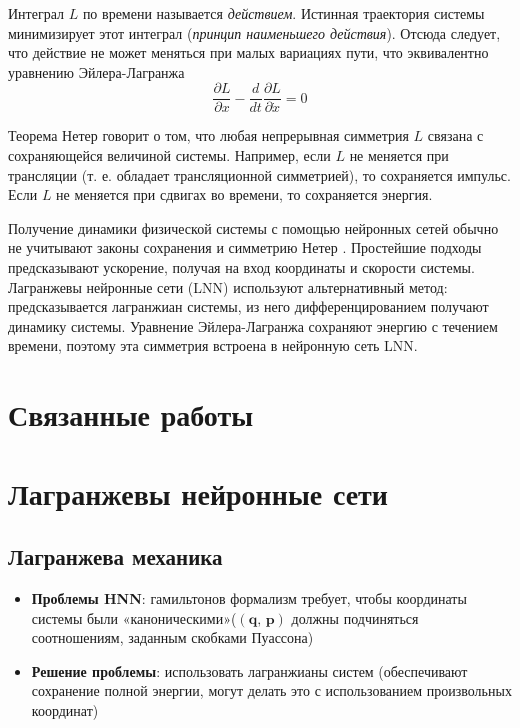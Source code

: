 \documentclass[12pt]{article}
\begin{document}
	Интеграл $L$ по времени называется \textit{действием}. Истинная траектория системы минимизирует этот интеграл (\textit{принцип наименьшего действия}). Отсюда следует, что действие не может меняться при малых вариациях пути, что эквивалентно уравнению Эйлера-Лагранжа
	$$
	\frac{\partial L}{\partial x}-\frac{d}{d t} \frac{\partial L}{\partial \dot{x}}=0
	$$
	
	Теорема Нетер говорит о том, что любая непрерывная симметрия $L$ связана с сохраняющейся величиной системы. Например, если $L$ не меняется при трансляции (т. е. обладает трансляционной симметрией), то сохраняется импульс. Если $L$ не меняется при сдвигах во времени, то сохраняется энергия.
	
	Получение динамики физической системы с помощью нейронных сетей обычно не учитывают законы сохранения и симметрию Нетер \cite{NEURIPS2019_26cd8eca, NEURIPS2019_26cd8eca, NEURIPS2019_26cd8eca}. Простейшие подходы предсказывают ускорение, получая на вход координаты и скорости системы. Лагранжевы нейронные сети (LNN) используют альтернативный метод: предсказывается лагранжиан системы, из него дифференцированием получают динамику системы. Уравнение Эйлера-Лагранжа сохраняют энергию с течением времени, поэтому эта симметрия встроена в нейронную сеть LNN.
	
	\section{Связанные работы}
	
	
	\section{Лагранжевы нейронные сети}
	\subsection{Лагранжева механика}
	\begin{itemize}
		\item \textbf{Проблемы HNN}: гамильтонов формализм требует, чтобы координаты системы были «каноническими»($(\textbf{q, p})$ должны подчиняться соотношениям, заданным скобками Пуассона) %
		\item \textbf{Решение проблемы}: использовать лагранжианы систем (обеспечивают сохранение полной энергии, могут делать это с использованием произвольных координат)
	\end{itemize}
	
\end{document}
